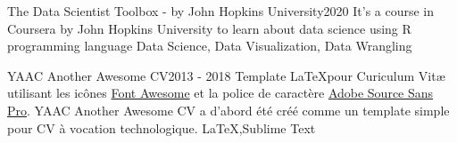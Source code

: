 %
%
%


\begin{projects}
	\project
	{The Data Scientist Toolbox - by John Hopkins University}{2020}
	{}
	{It's a course in Coursera by John Hopkins University to learn about data science using R programming language}
	{Data Science, Data Visualization, Data Wrangling}
				
	\project
	{YAAC Another Awesome CV}{2013 - 2018}
	{ }
	{Template \LaTeX pour Curiculum Vitæ utilisant les icônes \href{https://fontawesome.com}{Font Awesome} et la police de caractère \href{https://fonts.google.com/specimen/Source+Sans+Pro}{Adobe Source Sans Pro}. YAAC Another Awesome CV a d'abord été créé comme un template simple pour CV à vocation technologique.}
	{\LaTeX,Sublime Text}

\end{projects}